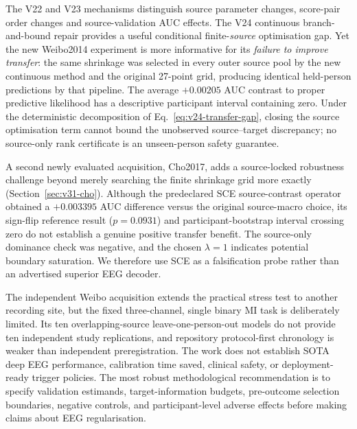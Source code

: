 \documentclass[12pt,a4paper]{article}
\begin{document}
The V22 and V23 mechanisms distinguish source parameter changes,
score-pair order changes and source-validation AUC effects.
The V24 continuous branch-and-bound repair provides a useful
conditional finite-\emph{source} optimisation gap. Yet the new
Weibo2014 experiment is more informative for its \emph{failure
to improve transfer}: the same shrinkage was selected
in every outer source pool by the new continuous method
and the original 27-point grid, producing identical
held-person predictions by that pipeline. The average
$+0.00205$ AUC contrast to proper predictive likelihood
has a descriptive participant interval containing zero.
Under the deterministic decomposition of
Eq.~\eqref{eq:v24-transfer-gap}, closing the source
optimisation term cannot bound the unobserved
source--target discrepancy; no source-only rank
certificate is an unseen-person safety guarantee.

A second newly evaluated acquisition, Cho2017, adds a
source-locked robustness challenge beyond merely searching
the finite shrinkage grid more exactly
(Section~\ref{sec:v31-cho}). Although the predeclared SCE
source-contrast operator obtained a $+0.003395$ AUC
difference versus the original source-macro choice,
its sign-flip reference result ($p=0.0931$) and
participant-bootstrap interval crossing zero do not
establish a genuine positive transfer benefit.
The source-only dominance check was negative, and the
chosen $\lambda=1$ indicates potential boundary saturation.
We therefore use SCE as a falsification probe rather than
an advertised superior EEG decoder.

The independent Weibo acquisition extends the practical
stress test to another recording site, but the fixed
three-channel, single binary MI task is deliberately
limited. Its ten overlapping-source leave-one-person-out
models do not provide ten independent study replications,
and repository protocol-first chronology is weaker than
independent preregistration. The work does not establish
SOTA deep EEG performance, calibration time saved,
clinical safety, or deployment-ready trigger policies.
The most robust methodological recommendation is to
specify validation estimands, target-information budgets,
pre-outcome selection boundaries, negative controls,
and participant-level adverse effects before making
claims about EEG regularisation.
\end{document}
